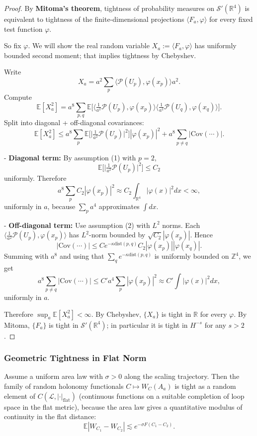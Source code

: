 \begin{proof}
By \textbf{Mitoma's theorem}, tightness of probability measures on $\mathcal{S}'(\mathbb{R}^4)$ is equivalent to tightness of the finite-dimensional projections $\langle F_a,\varphi\rangle$ for every fixed test function $\varphi$.

So fix $\varphi$. We will show the real random variable $X_a:=\langle F_a,\varphi\rangle$ has uniformly bounded second moment; that implies tightness by Chebyshev.

Write
\[
X_a = a^2 \sum_{p} \langle \mathcal P(U_p), \varphi(x_p)\rangle a^2.
\]
Compute
\[
\mathbb E[X_a^2]
= a^8 \sum_{p,q} \mathbb E\Big[\langle \tfrac{1}{a^2}\mathcal P(U_p),\varphi(x_p)\rangle \langle \tfrac{1}{a^2}\mathcal P(U_q),\varphi(x_q)\rangle\Big].
\]
Split into diagonal + off-diagonal covariances:
\[
\mathbb E[X_a^2]
\le a^8 \sum_{p}\mathbb E\Big[\big|\tfrac{1}{a^2}\mathcal P(U_p)\big|^2\Big]|\varphi(x_p)|^2
+ a^8 \sum_{p\ne q} |\mathrm{Cov}(\cdots)|.
\]

- \textbf{Diagonal term:} By assumption (1) with $p=2$,
  \[
  \mathbb E\Big[\big|\tfrac{1}{a^2}\mathcal P(U_p)\big|^2\Big]\le C_2
  \]
  uniformly. Therefore
  \[
  a^8 \sum_p C_2 |\varphi(x_p)|^2 \approx C_2 \int_{\mathbb R^4} |\varphi(x)|^2 dx <\infty,
  \]
  uniformly in $a$, because $\sum_p a^4$ approximates $\int dx$.

- \textbf{Off-diagonal term:} Use assumption (2) with $L^2$ norms. Each $\langle \frac{1}{a^2}\mathcal P(U_p),\varphi(x_p)\rangle$ has $L^2$-norm bounded by $\sqrt{C_2}|\varphi(x_p)|$. Hence
  \[
  |\mathrm{Cov}(\cdots)| \le C e^{-\kappa \mathrm{dist}(p,q)} C_2 |\varphi(x_p)| |\varphi(x_q)|.
  \]
  Summing with $a^8$ and using that $\sum_q e^{-\kappa \mathrm{dist}(p,q)}$ is uniformly bounded on $\mathbb Z^4$, we get
  \[
  a^8\sum_{p\ne q} |\mathrm{Cov}(\cdots)|
  \le C' a^4 \sum_p |\varphi(x_p)|^2
  \approx C' \int |\varphi(x)|^2 dx,
  \]
  uniformly in $a$.

Therefore $\sup_a \mathbb E[X_a^2] <\infty$. By Chebyshev, $\{X_a\}$ is tight in $\mathbb R$ for every $\varphi$. By Mitoma, $\{F_a\}$ is tight in $\mathcal{S}'(\mathbb{R}^4)$; in particular it is tight in $H^{-s}$ for any $s>2$.
\end{proof}

\subsubsection{Geometric Tightness in Flat Norm}

\begin{proposition}
Assume a uniform area law with $\sigma > 0$ along the scaling trajectory. Then the family of random holonomy functionals $C \mapsto W_C(A_a)$ is tight as a random element of $C(\mathcal{L}, |\cdot|_{\mathrm{flat}})$ (continuous functions on a suitable completion of loop space in the flat metric), because the area law gives a quantitative modulus of continuity in the flat distance:
\begin{equation}
\mathbb{E} |W_{C_1} - W_{C_2}| \lesssim e^{-\sigma F(C_1 - C_2)}.
\end{equation}
\end{proposition}

